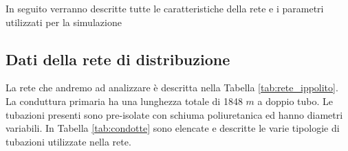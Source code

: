 \documentclass[laurea,oneside,11pt]{USiena_tesiLM}
\begin{document}
In seguito verranno descritte tutte le caratteristiche della rete e i parametri utilizzati per la simulazione

\subsection{Dati della rete di distribuzione}
La rete che andremo ad analizzare è descritta nella Tabella \ref{tab:rete_ippolito}. La conduttura primaria ha una lunghezza totale di 1848 $m$ a doppio tubo. Le tubazioni presenti sono pre-isolate con schiuma poliuretanica ed hanno diametri variabili. In Tabella \ref{tab:condotte} sono elencate e descritte le varie tipologie di tubazioni utilizzate nella rete.


\begin{table}[!ht]
\centering
{}
\end{table}
\end{document}

